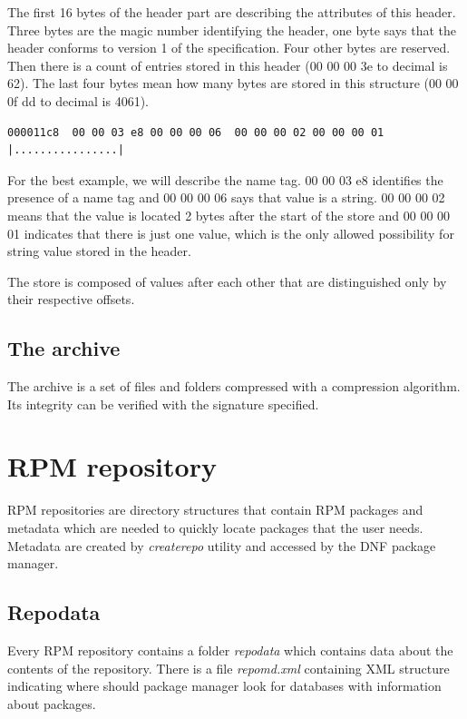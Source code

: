 The first 16 bytes of the header part are describing the attributes of this header. Three bytes are
the magic number identifying the header, one byte says that the header conforms to version 1 of the specification.
Four other bytes are reserved. Then there is a count of entries stored in this header
(00 00 00 3e to decimal is 62). The last four bytes mean how many bytes are stored in this structure
(00 00 0f dd to decimal is 4061).

\begin{lstlisting}
000011c8  00 00 03 e8 00 00 00 06  00 00 00 02 00 00 00 01  |................|
\end{lstlisting}

For the best example, we will describe the name tag. 00 00 03 e8 identifies the presence of
a name tag and 00 00 00 06 says that value is a string. 00 00 00 02 means that the value
is located 2 bytes after the start of the store and 00 00 00 01 indicates that there is
just one value, which is the only allowed possibility for string value stored in the header.

The store is composed of values after each other that are distinguished only by their respective offsets.

\subsection*{The archive}
The archive is a set of files and folders compressed with a compression algorithm. Its integrity
can be verified with the signature specified.

\section{RPM repository}
RPM repositories are directory structures that contain RPM packages and metadata which are needed
to quickly locate packages that the user needs. Metadata are created by \textit{createrepo} \cite{RPMRepository}
utility and accessed by the DNF package manager. 

\subsection*{Repodata}
Every RPM repository contains a folder \textit{repodata} which contains data about the contents of the
repository. There is a file \textit{repomd.xml} containing XML structure indicating where should
package manager look for databases with information about packages.

